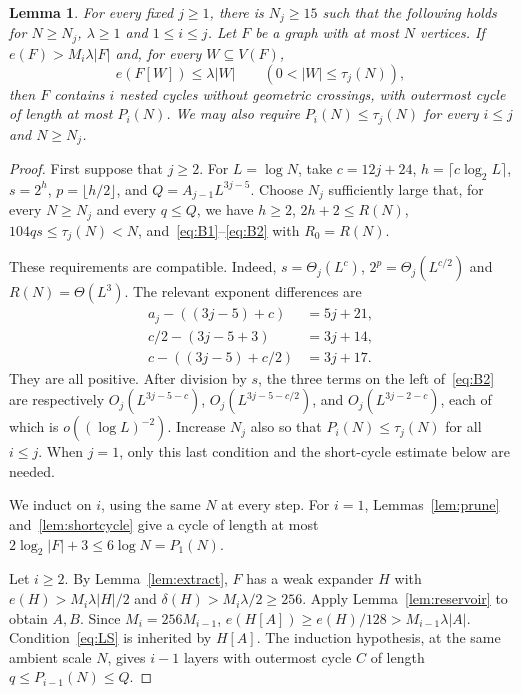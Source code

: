 \documentclass[10pt,letterpaper]{article}
\newtheorem{lemma}[theorem]{Lemma}
\theoremstyle{definition}
\theoremstyle{remark}
\begin{document}
\begin{lemma}\label{lem:localshort}
For every fixed $j\ge1$, there is $N_j\ge15$ such that the following holds for $N\ge N_j$, $\lambda\ge1$ and $1\le i\le j$. Let $F$ be a graph with at most $N$ vertices. If $e(F)>M_i\lambda|F|$ and, for every $W\subseteq V(F)$,
\begin{equation}\label{eq:LS}
e(F[W])\le\lambda|W|\qquad(0<|W|\le\tau_j(N)),
\end{equation}
then $F$ contains $i$ nested cycles without geometric crossings, with outermost cycle of length at most $P_i(N)$. We may also require $P_i(N)\le\tau_j(N)$ for every $i\le j$ and $N\ge N_j$.
\end{lemma}
\begin{proof}
First suppose that $j\ge2$. For $L=\log N$, take $c=12j+24$, $h=\lceil c\log_2L\rceil$, $s=2^h$, $p=\lfloor h/2\rfloor$, and $Q=A_{j-1}L^{3j-5}$. Choose $N_j$ sufficiently large that, for every $N\ge N_j$ and every $q\le Q$, we have $h\ge2$, $2h+2\le R(N)$, $104qs\le\tau_j(N)<N$, and~\eqref{eq:B1}--\eqref{eq:B2} with $R_0=R(N)$.

These requirements are compatible. Indeed, $s=\Theta_j(L^c)$, $2^p=\Theta_j(L^{c/2})$ and $R(N)=\Theta(L^3)$. The relevant exponent differences are
\begin{align*}
a_j-((3j-5)+c)&=5j+21,\\
c/2-(3j-5+3)&=3j+14,\\
c-((3j-5)+c/2)&=3j+17.
\end{align*}
They are all positive. After division by $s$, the three terms on the left of~\eqref{eq:B2} are respectively $O_j(L^{3j-5-c})$, $O_j(L^{3j-5-c/2})$, and $O_j(L^{3j-2-c})$, each of which is $o((\log L)^{-2})$. Increase $N_j$ also so that $P_i(N)\le\tau_j(N)$ for all $i\le j$. When $j=1$, only this last condition and the short-cycle estimate below are needed.

We induct on $i$, using the same $N$ at every step. For $i=1$, Lemmas~\ref{lem:prune} and~\ref{lem:shortcycle} give a cycle of length at most $2\log_2|F|+3\le6\log N=P_1(N)$.

Let $i\ge2$. By Lemma~\ref{lem:extract}, $F$ has a weak expander $H$ with $e(H)>M_i\lambda|H|/2$ and $\delta(H)>M_i\lambda/2\ge256$. Apply Lemma~\ref{lem:reservoir} to obtain $A,B$. Since $M_i=256M_{i-1}$, $e(H[A])\ge e(H)/128>M_{i-1}\lambda|A|$. Condition~\eqref{eq:LS} is inherited by $H[A]$. The induction hypothesis, at the same ambient scale $N$, gives $i-1$ layers with outermost cycle $C$ of length $q\le P_{i-1}(N)\le Q$.


\end{proof}
\end{document}
